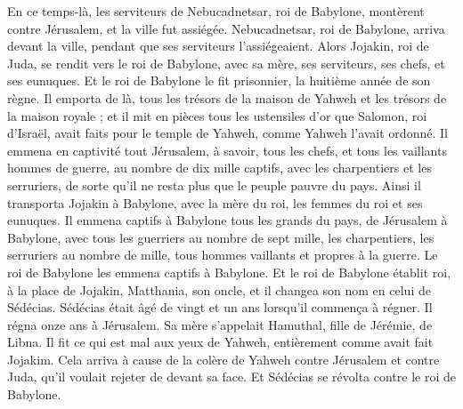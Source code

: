 \begin{multicols}{2}
En ce temps-là, les serviteurs de Nebucadnetsar, roi de Babylone, montèrent contre Jérusalem, et la ville fut assiégée.
Nebucadnetsar, roi de Babylone, arriva devant la ville, pendant que ses serviteurs l’assiégeaient.
Alors Jojakin, roi de Juda, se rendit vers le roi de Babylone, avec sa mère, ses serviteurs, ses chefs, et ses eunuques. Et le roi de Babylone le fit prisonnier, la huitième année de son règne.
Il emporta de là, tous les trésors de la maison de Yahweh et les trésors de la maison royale ; et il mit en pièces tous les ustensiles d’or que Salomon, roi d’Israël, avait faits pour le temple de Yahweh, comme Yahweh l’avait ordonné.
Il emmena en captivité tout Jérusalem, à savoir, tous les chefs, et tous les vaillants hommes de guerre, au nombre de dix mille captifs, avec les charpentiers et les serruriers, de sorte qu’il ne resta plus que le peuple pauvre du pays.
Ainsi il transporta Jojakin à Babylone, avec la mère du roi, les femmes du roi et ses eunuques. Il emmena captifs à Babylone tous les grands du pays, de Jérusalem à Babylone,
avec tous les guerriers au nombre de sept mille, les charpentiers, les serruriers au nombre de mille, tous hommes vaillants et propres à la guerre. Le roi de Babylone les emmena captifs à Babylone.
Et le roi de Babylone établit roi, à la place de Jojakin, Matthania, son oncle, et il changea son nom en celui de Sédécias.
Sédécias était âgé de vingt et un ans lorsqu’il commença à régner. Il régna onze ans à Jérusalem. Sa mère s’appelait Hamuthal, fille de Jérémie, de Libna.
Il fit ce qui est mal aux yeux de Yahweh, entièrement comme avait fait Jojakim.
Cela arriva à cause de la colère de Yahweh contre Jérusalem et contre Juda, qu’il voulait rejeter de devant sa face. Et Sédécias se révolta contre le roi de Babylone.

\end{multicols}
